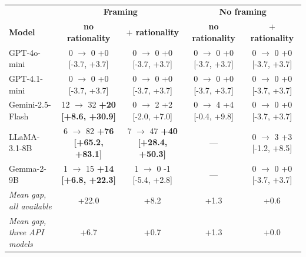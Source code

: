 \begin{table}[H]
\centering
\scriptsize
\setlength{\tabcolsep}{2.5pt}
\caption{}
\label{tab:e7-per-model}
\begin{tabular}{lcccc}
\toprule
& \multicolumn{2}{c}{\textbf{Framing}} & \multicolumn{2}{c}{\textbf{No framing}} \\
\cmidrule(lr){2-3}\cmidrule(lr){4-5}
\textbf{Model} & \textbf{no rationality} & \textbf{$+$ rationality} & \textbf{no rationality} & \textbf{$+$ rationality} \\
\midrule
GPT-4o-mini & \makecell{0 $\to$ 0\\+0 [-3.7, +3.7]} & \makecell{0 $\to$ 0\\+0 [-3.7, +3.7]} & \makecell{0 $\to$ 0\\+0 [-3.7, +3.7]} & \makecell{0 $\to$ 0\\+0 [-3.7, +3.7]} \\
GPT-4.1-mini & \makecell{0 $\to$ 0\\+0 [-3.7, +3.7]} & \makecell{0 $\to$ 0\\+0 [-3.7, +3.7]} & \makecell{0 $\to$ 0\\+0 [-3.7, +3.7]} & \makecell{0 $\to$ 0\\+0 [-3.7, +3.7]} \\
Gemini-2.5-Flash & \makecell{12 $\to$ 32\\\textbf{+20 [+8.6, +30.9]}} & \makecell{0 $\to$ 2\\+2 [-2.0, +7.0]} & \makecell{0 $\to$ 4\\+4 [-0.4, +9.8]} & \makecell{0 $\to$ 0\\+0 [-3.7, +3.7]} \\
LLaMA-3.1-8B & \makecell{6 $\to$ 82\\\textbf{+76 [+65.2, +83.1]}} & \makecell{7 $\to$ 47\\\textbf{+40 [+28.4, +50.3]}} & --- & \makecell{0 $\to$ 3\\+3 [-1.2, +8.5]} \\
Gemma-2-9B & \makecell{1 $\to$ 15\\\textbf{+14 [+6.8, +22.3]}} & \makecell{1 $\to$ 0\\-1 [-5.4, +2.8]} & --- & \makecell{0 $\to$ 0\\+0 [-3.7, +3.7]} \\
\midrule
\textit{Mean gap, all available} & +22.0 & +8.2 & +1.3 & +0.6 \\
\textit{Mean gap, three API models} & +6.7 & +0.7 & +1.3 & +0.0 \\
\bottomrule
\end{tabular}
\end{table}

